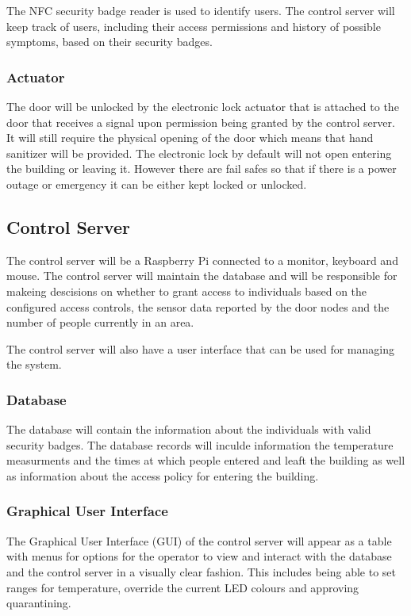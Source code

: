 The NFC security badge reader is used to identify users. The control server will
keep track of users, including their access permissions and history of possible
symptoms, based on their security badges.

\subsubsection{Actuator}
The door will be unlocked by the electronic lock actuator that is attached to the door that receives a signal upon permission being granted by the control server. It will still require the physical opening of the door which means
that hand sanitizer will be provided. The electronic lock by default will not open entering the building or leaving it. However there are fail safes so that if there is a power outage or emergency it can be either kept locked or unlocked.

\subsection{Control Server}
The control server will be a Raspberry Pi connected to a monitor, keyboard and
mouse. The control server will maintain the database and will be responsible for
makeing descisions on whether to grant access to individuals based on the
configured access controls, the sensor data reported by the door nodes and the 
number of people currently in an area. 

The control server will also have a user interface that can be used for managing
the system.

\subsubsection{Database}
The database will contain the information about the individuals with valid
security badges. The database records will inculde information the temperature
measurments and the times at which people entered and leaft the building as well
as information about the access policy for entering the building.

\subsubsection{Graphical User Interface}
The Graphical User Interface (GUI) of the control server will appear as a table
with menus for options for the operator to view and interact with the database and the control server in a visually clear fashion. This includes being able to set ranges for temperature, override the current LED colours and approving quarantining.


